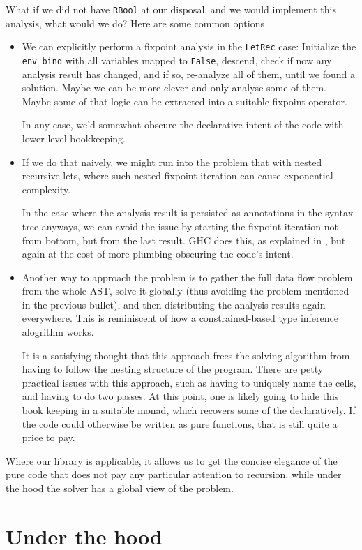 \documentclass[manuscript,screen,acmsmall]{acmart}
\begin{document}
What if we did not have \verb|RBool| at our disposal, and we would implement this analysis, what would we do? Here are some common options
\begin{itemize}
\item We can explicitly perform a fixpoint analysis in the \verb|LetRec| case: Initialize the \verb|env_bind| with all variables mapped to \verb|False|, descend, check if now any analysis result has changed, and if so, re-analyze all of them, until we found a solution.
Maybe we can be more clever and only analyse some of them.
Maybe some of that logic can be extracted into a suitable fixpoint operator.

In any case, we'd somewhat obscure the declarative intent of the code with lower-level bookkeeping.
\item If we do that naively, we might run into the problem that with nested recursive lets, where such nested fixpoint iteration can cause exponential complexity.

In the case where the analysis result is persisted as annotations in the syntax tree anyways, we can avoid the issue by starting the fixpoint iteration not from bottom, but from the last result. GHC does this, as explained in
\citet[Section 6.6]{modular}, but again at the cost of more plumbing obscuring the code's intent.

\item Another way to approach the problem is to gather the full data flow problem from the whole AST, solve it globally (thus avoiding the problem mentioned in the previous bullet), and then distributing the analysis results again everywhere. This is reminiscent of how a constrained-based type inference alogrithm works.

It is a satisfying thought that this approach frees the solving algorithm from having to follow the nesting structure of the program. There are petty practical issues with this approach, such as having to uniquely name the cells, and having to do two passes. At this point, one is likely going to hide this book keeping in a suitable monad, which recovers some of the declaratively. If the code could otherwise be written as pure functions, that is still quite a price to pay.
\end{itemize}
Where our library is applicable, it allows us to get the concise elegance of the pure code that does not pay any particular attention to recursion, while under the hood the solver has a global view of the problem.


\section{Under the hood}\label{sec:impl}
\end{document}
